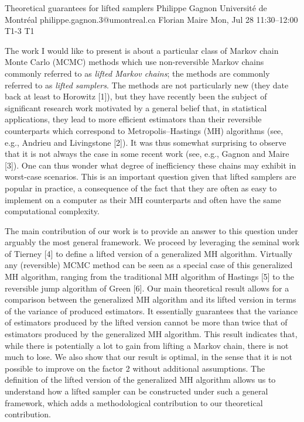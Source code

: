 \begin{talk}
  {Theoretical guarantees for lifted samplers}%
  {Philippe Gagnon}%
  {Universit\'e de Montr\'eal}%
  {philippe.gagnon.3@umontreal.ca}%
  {Florian Maire}%
  {}%
  {Mon, Jul 28 11:30--12:00}%
  {T1-3}%
  {T1}%
  {}%
    
   
The work I would like to present is about a particular class of Markov chain Monte Carlo (MCMC) methods which use non-reversible Markov chains commonly referred to as \textit{lifted Markov chains}; the methods are commonly referred to as \textit{lifted samplers}. The methods are not particularly new (they date back at least to Horowitz [1]), but they have recently been the subject of significant research work motivated by a general belief that, in statistical applications, they lead to more efficient estimators than their reversible counterparts which correspond to Metropolis--Hastings (MH) algorithms (see, e.g., Andrieu and Livingstone [2]). It was thus somewhat surprising to observe that it is not always the case in some recent work (see, e.g., Gagnon and Maire [3]). One can thus wonder what degree of inefficiency these chains may exhibit in worst-case scenarios. This is an important question given that lifted samplers are popular in practice, a consequence of the fact that they are often as easy to implement on a computer as their MH counterparts and often have the same computational complexity.

The main contribution of our work is to provide an answer to this question under arguably the most general framework. We proceed by leveraging the seminal work of Tierney [4] to define a lifted version of a generalized MH algorithm. Virtually any (reversible) MCMC method can be seen as a special case of this generalized MH algorithm, ranging from the traditional MH algorithm of Hastings [5] to the reversible jump algorithm of Green [6]. Our main theoretical result allows for a comparison between the generalized MH algorithm and its lifted version in terms of the variance of produced estimators. It essentially guarantees that the variance of estimators produced by the lifted version cannot be more than twice that of estimators produced by the generalized MH algorithm. This result indicates that, while there is potentially a lot to gain from lifting a Markov chain, there is not much to lose. We also show that our result is optimal, in the sense that it is not possible to improve on the factor 2 without additional assumptions. The definition of the lifted version of the generalized MH algorithm allows us to understand how a lifted sampler can be constructed under such a general framework, which adds a methodological contribution to our theoretical contribution.


\end{talk}
